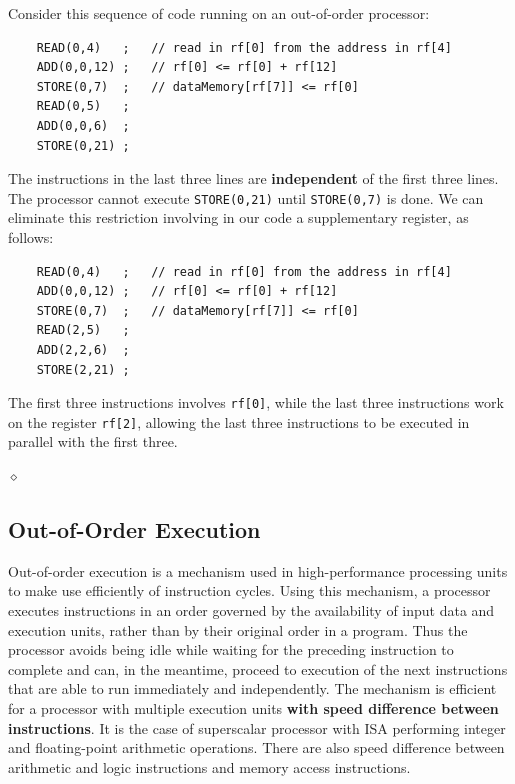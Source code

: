 \begin{exemplu}
Consider this sequence of code running on an out-of-order processor:
\begin{verbatim}
    READ(0,4)   ;   // read in rf[0] from the address in rf[4]
    ADD(0,0,12) ;   // rf[0] <= rf[0] + rf[12]
    STORE(0,7)  ;   // dataMemory[rf[7]] <= rf[0]
    READ(0,5)   ;
    ADD(0,0,6)  ;
    STORE(0,21) ;
\end{verbatim}
The instructions in the last three lines are {\bf independent} of the first three lines. The processor cannot execute {\tt STORE(0,21)} until  {\tt STORE(0,7)} is done.
We can eliminate this restriction involving in our code a supplementary register, as follows:
\begin{verbatim}
    READ(0,4)   ;   // read in rf[0] from the address in rf[4]
    ADD(0,0,12) ;   // rf[0] <= rf[0] + rf[12]
    STORE(0,7)  ;   // dataMemory[rf[7]] <= rf[0]
    READ(2,5)   ;
    ADD(2,2,6)  ;
    STORE(2,21) ;
\end{verbatim}
The first three instructions involves {\tt rf[0]}, while the last three instructions work on the register {\tt rf[2]}, allowing the last three instructions to be executed in parallel with the first three.

$\diamond$
\end{exemplu}


\subsection{Out-of-Order Execution}

Out-of-order execution  is a mechanism used in  high-performance  processing units to make use efficiently  of instruction cycles. Using this mechanism, a processor executes instructions in an order governed by the availability of input data and execution units, rather than by their original order in a program. Thus the processor  avoids being idle while waiting for the preceding instruction to complete and can, in the meantime, proceed to execution of the next instructions that are able to run immediately and independently.
The mechanism is efficient for a processor with multiple execution units {\bf with speed difference between instructions}. It is the case of superscalar processor with ISA performing integer and floating-point arithmetic operations. There are also speed difference between arithmetic and logic instructions and memory access instructions.

